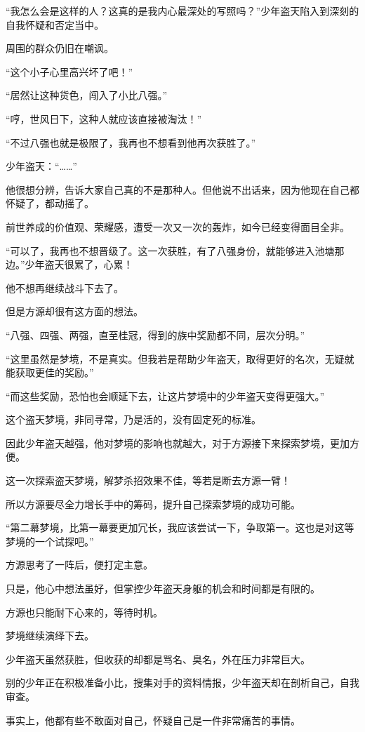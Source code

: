 \begin{this_body}
“我怎么会是这样的人？这真的是我内心最深处的写照吗？”少年盗天陷入到深刻的自我怀疑和否定当中。

周围的群众仍旧在嘲讽。

“这个小子心里高兴坏了吧！”

“居然让这种货色，闯入了小比八强。”

“哼，世风日下，这种人就应该直接被淘汰！”

“不过八强也就是极限了，我再也不想看到他再次获胜了。”

少年盗天：“……”

他很想分辨，告诉大家自己真的不是那种人。但他说不出话来，因为他现在自己都怀疑了，都动摇了。

前世养成的价值观、荣耀感，遭受一次又一次的轰炸，如今已经变得面目全非。

“可以了，我再也不想晋级了。这一次获胜，有了八强身份，就能够进入池塘那边。”少年盗天很累了，心累！

他不想再继续战斗下去了。

但是方源却很有这方面的想法。

“八强、四强、两强，直至桂冠，得到的族中奖励都不同，层次分明。”

“这里虽然是梦境，不是真实。但我若是帮助少年盗天，取得更好的名次，无疑就能获取更佳的奖励。”

“而这些奖励，恐怕也会顺延下去，让这片梦境中的少年盗天变得更强大。”

这个盗天梦境，非同寻常，乃是活的，没有固定死的标准。

因此少年盗天越强，他对梦境的影响也就越大，对于方源接下来探索梦境，更加方便。

这一次探索盗天梦境，解梦杀招效果不佳，等若是断去方源一臂！

所以方源要尽全力增长手中的筹码，提升自己探索梦境的成功可能。

“第二幕梦境，比第一幕要更加冗长，我应该尝试一下，争取第一。这也是对这等梦境的一个试探吧。”

方源思考了一阵后，便打定主意。

只是，他心中想法虽好，但掌控少年盗天身躯的机会和时间都是有限的。

方源也只能耐下心来的，等待时机。

梦境继续演绎下去。

少年盗天虽然获胜，但收获的却都是骂名、臭名，外在压力非常巨大。

别的少年正在积极准备小比，搜集对手的资料情报，少年盗天却在剖析自己，自我审查。

事实上，他都有些不敢面对自己，怀疑自己是一件非常痛苦的事情。


\end{this_body}
